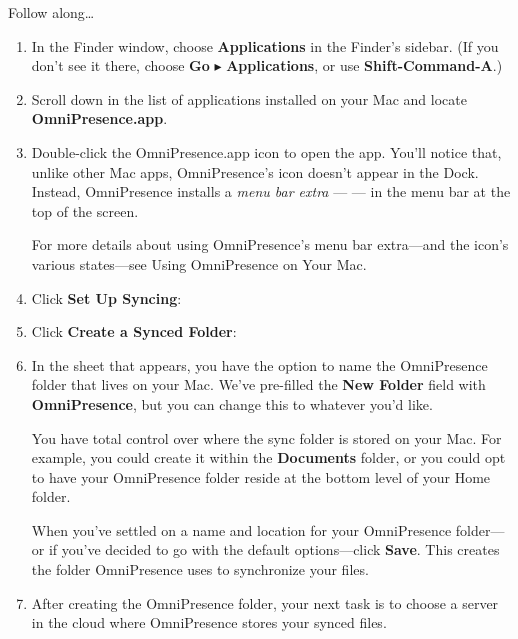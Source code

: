 \documentclass[../main.tex]{subfiles}
\begin{document}
Follow along\ldots{}

\begin{enumerate}
  \item In the Finder window, choose \textbf{Applications} in the Finder's sidebar. (If you
      don't see it there, choose \textbf{Go} $\blacktriangleright$ \textbf{Applications}, or use
    \textbf{Shift-Command-A}.)

  \item Scroll down in the list of applications installed on your Mac and locate
    \textbf{OmniPresence.app}.
  \item Double-click the OmniPresence.app icon to open the app. You'll notice that, unlike other
    Mac apps, OmniPresence's icon doesn't appear in the Dock. Instead, OmniPresence installs a
    \textit{menu bar extra} ---  --- in the menu
    bar at the top of the screen.


    For more details about using OmniPresence's menu bar extra---and the icon's various
    states---see Using OmniPresence on Your Mac.
  \item Click \textbf{Set Up Syncing}:

  \item Click \textbf{Create a Synced Folder}:

  \item In the sheet that appears, you have the option to name the OmniPresence folder that
    lives on your Mac. We've pre-filled the \textbf{New Folder} field with
    \textbf{OmniPresence}, but you can change this to whatever you'd like.

    You have total control over where the sync folder is stored on your Mac. For example, you
    could create it within the \textbf{Documents} folder, or you could opt to have your
    OmniPresence folder reside at the bottom level of your Home folder.



    When you've settled on a name and location for your OmniPresence folder---or if you've decided
    to go with the default options---click \textbf{Save}. This creates the folder OmniPresence
    uses to synchronize your files.
  \item After creating the OmniPresence folder, your next task is to choose a server in the
    cloud where OmniPresence stores your synced files.


\end{enumerate}
\end{document}
